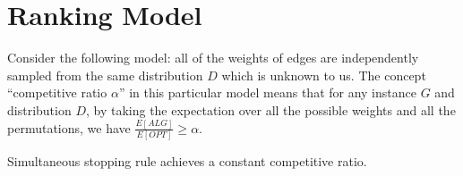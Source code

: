 \chapter{Ranking Model}

Consider the following model:
all of the weights of edges are independently sampled from the same distribution $D$ which is unknown to us.
The concept ``competitive ratio $\alpha$'' in this particular model means that for any instance $G$ and distribution $D$, by taking the expectation over all the possible weights and all the permutations, we have $\frac{E[ALG]}{E[OPT]} \ge \alpha$.

\begin{theorem}\label{rothm}
    Simultaneous stopping rule achieves a constant competitive ratio.
\end{theorem}

